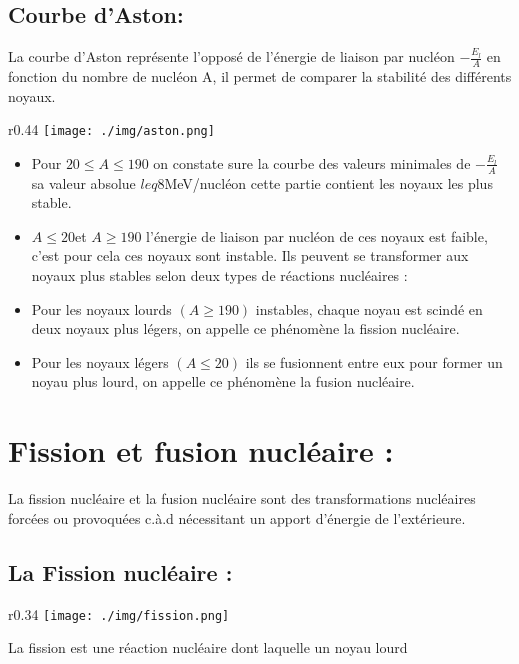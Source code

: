\documentclass[12pt]{article}
\begin{document}
\subsection{Courbe d'Aston: }

La courbe d'Aston représente l'opposé de l'énergie de liaison par nucléon $-\frac{E_l}{A}$ en fonction du nombre de nucléon A, il permet de comparer la stabilité des différents
noyaux.
\begin{wrapfigure}[11]{r}{0.44\textwidth}
	\texttt{[image: ./img/aston.png]}
\end{wrapfigure}
\begin{itemize}
	\item Pour $20 \leq A \leq 190$ on constate sure la courbe des valeurs minimales de  $-\frac{E_l}{A}$ sa valeur absolue $leq 8$MeV/nucléon cette partie contient les noyaux les plus stable.
	\item $A \leq 20 $et $A \geq 190$ l'énergie de liaison par nucléon de ces noyaux est faible,
c'est pour cela ces noyaux sont instable. Ils peuvent se transformer aux noyaux plus
stables selon deux types de réactions nucléaires : 

\item Pour les noyaux lourds $(A \geq 190)$ instables, chaque noyau est scindé en deux noyaux
plus légers, on appelle ce phénomène la fission nucléaire.

\item Pour les noyaux légers $(A \leq 20)$ ils se fusionnent entre eux pour former un noyau
plus lourd, on appelle ce phénomène la fusion nucléaire.
\end{itemize}

\section{Fission et fusion nucléaire : }

La fission nucléaire et la fusion nucléaire sont des transformations nucléaires
forcées ou provoquées c.à.d nécessitant un apport d’énergie de l’extérieure.

\subsection{ La Fission nucléaire :  }
\begin{wrapfigure}[1]{r}{0.34\textwidth}
	\vspace{-1cm}
	\texttt{[image: ./img/fission.png]}
\end{wrapfigure}
La fission est une réaction nucléaire dont laquelle un noyau lourd 
\end{document}
